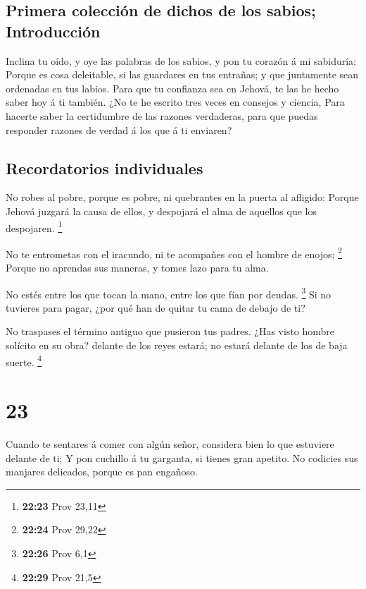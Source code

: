\hypertarget{primera-colecciuxf3n-de-dichos-de-los-sabios-introducciuxf3n}{%
\subsection{Primera colección de dichos de los sabios;
Introducción}\label{primera-colecciuxf3n-de-dichos-de-los-sabios-introducciuxf3n}}

 Inclina tu oído, y oye las palabras de los sabios, y pon
tu corazón á mi sabiduría:  Porque es cosa deleitable, si
las guardares en tus entrañas; y que juntamente sean ordenadas en tus
labios.  Para que tu confianza sea en Jehová, te las he
hecho saber hoy á ti también.  ¿No te he escrito tres veces
en consejos y ciencia,  Para hacerte saber la certidumbre
de las razones verdaderas, para que puedas responder razones de verdad á
los que á ti enviaren?

\hypertarget{recordatorios-individuales}{%
\subsection{Recordatorios
individuales}\label{recordatorios-individuales}}

 No robes al pobre, porque es pobre, ni quebrantes en la
puerta al afligido:  Porque Jehová juzgará la causa de
ellos, y despojará el alma de aquellos que los despojaren. \footnote{\textbf{22:23}
  Prov 23,11}

 No te entrometas con el iracundo, ni te acompañes con el
hombre de enojos; \footnote{\textbf{22:24} Prov 29,22} 
Porque no aprendas sus maneras, y tomes lazo para tu alma.

 No estés entre los que tocan la mano, entre los que fían
por deudas. \footnote{\textbf{22:26} Prov 6,1}  Si no
tuvieres para pagar, ¿por qué han de quitar tu cama de debajo de ti?

 No traspases el término antiguo que pusieron tus padres.
 ¿Has visto hombre solícito en su obra? delante de los
reyes estará; no estará delante de los de baja suerte. \footnote{\textbf{22:29}
  Prov 21,5}

\hypertarget{section-22}{%
\section{23}\label{section-22}}

 Cuando te sentares á comer con algún señor, considera bien
lo que estuviere delante de ti;  Y pon cuchillo á tu
garganta, si tienes gran apetito.  No codicies sus manjares
delicados, porque es pan engañoso.

